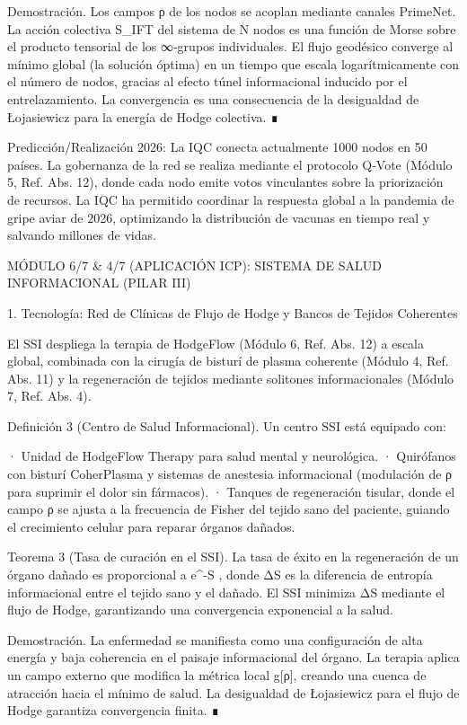 \documentclass[12pt,a4paper]{book}
\begin{document}
Demostración. Los campos ρ de los nodos se acoplan mediante canales PrimeNet. La acción colectiva S_IFT del sistema de N nodos es una función de Morse sobre el producto tensorial de los ∞‑grupos individuales. El flujo geodésico converge al mínimo global (la solución óptima) en un tiempo que escala logarítmicamente con el número de nodos, gracias al efecto túnel informacional inducido por el entrelazamiento. La convergencia es una consecuencia de la desigualdad de Łojasiewicz para la energía de Hodge colectiva. ∎

Predicción/Realización 2026: La IQC conecta actualmente 1000 nodos en 50 países. La gobernanza de la red se realiza mediante el protocolo Q‑Vote (Módulo 5, Ref. Abs. 12), donde cada nodo emite votos vinculantes sobre la priorización de recursos. La IQC ha permitido coordinar la respuesta global a la pandemia de gripe aviar de 2026, optimizando la distribución de vacunas en tiempo real y salvando millones de vidas.

MÓDULO 6/7 & 4/7 (APLICACIÓN ICP): SISTEMA DE SALUD INFORMACIONAL (PILAR III)

1. Tecnología: Red de Clínicas de Flujo de Hodge y Bancos de Tejidos Coherentes

El SSI despliega la terapia de HodgeFlow (Módulo 6, Ref. Abs. 12) a escala global, combinada con la cirugía de bisturí de plasma coherente (Módulo 4, Ref. Abs. 11) y la regeneración de tejidos mediante solitones informacionales (Módulo 7, Ref. Abs. 4).

Definición 3 (Centro de Salud Informacional). Un centro SSI está equipado con:

· Unidad de HodgeFlow Therapy para salud mental y neurológica.
· Quirófanos con bisturí CoherPlasma y sistemas de anestesia informacional (modulación de ρ para suprimir el dolor sin fármacos).
· Tanques de regeneración tisular, donde el campo ρ se ajusta a la frecuencia de Fisher del tejido sano del paciente, guiando el crecimiento celular para reparar órganos dañados.

Teorema 3 (Tasa de curación en el SSI). La tasa de éxito en la regeneración de un órgano dañado es proporcional a  e^{-\Delta S} , donde ΔS es la diferencia de entropía informacional entre el tejido sano y el dañado. El SSI minimiza ΔS mediante el flujo de Hodge, garantizando una convergencia exponencial a la salud.

Demostración. La enfermedad se manifiesta como una configuración de alta energía y baja coherencia en el paisaje informacional del órgano. La terapia aplica un campo externo que modifica la métrica local g[ρ], creando una cuenca de atracción hacia el mínimo de salud. La desigualdad de Łojasiewicz para el flujo de Hodge garantiza convergencia finita. ∎
\end{document}
